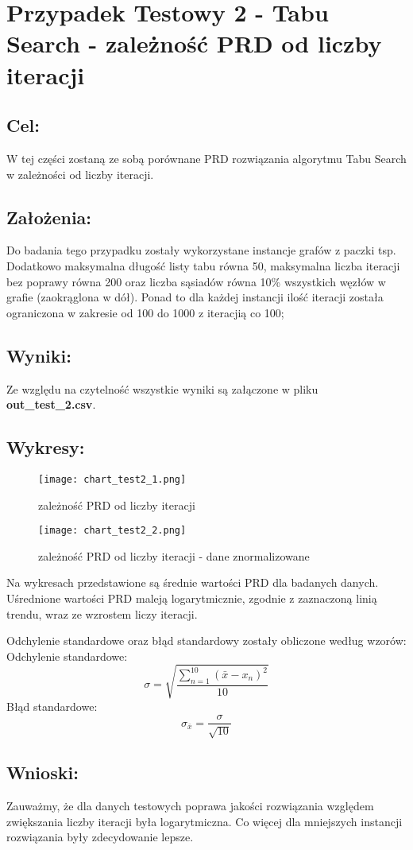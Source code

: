 \section{Przypadek Testowy 2 - Tabu Search - zależność PRD od liczby iteracji}
  \subsection{Cel:}
    W tej części zostaną ze sobą porównane PRD rozwiązania algorytmu Tabu Search w zależności od liczby iteracji.
    \subsection{Założenia:}
    Do badania tego przypadku zostały wykorzystane instancje grafów z paczki tsp. Dodatkowo maksymalna długość listy tabu równa 50, maksymalna liczba iteracji bez poprawy równa 200 oraz liczba sąsiadów równa 10\% wszystkich węzłów w grafie (zaokrąglona w dół). Ponad to dla każdej instancji ilość iteracji została ograniczona w zakresie od 100 do 1000 z iteracjią co 100;
  \subsection{Wyniki: }
    Ze względu na czytelność wszystkie wyniki są załączone w pliku \textbf{out_test_2.csv}.
  \subsection{Wykresy: }
    \begin{figure}[H]
      \texttt{[image: chart\_test2\_1.png]}
      \centering
      \caption{zależność PRD od liczby iteracji}
    \end{figure}
    \begin{figure}[H]
      \texttt{[image: chart\_test2\_2.png]}
      \centering
      \caption{zależność PRD od liczby iteracji - dane znormalizowane}
    \end{figure}

    Na wykresach przedstawione są średnie wartości PRD dla badanych danych. Uśrednione wartości PRD maleją logarytmicznie, zgodnie z zaznaczoną linią trendu, wraz ze wzrostem liczy iteracji.

    Odchylenie standardowe oraz błąd standardowy zostały obliczone według wzorów: \\
    Odchylenie standardowe:
    \[ \sigma = \sqrt{\frac{\sum_{n = 1}^{10}(\bar{x} - x_n)^2}{10}} \]
    Błąd standardowe:
    \[ \sigma_{\bar{x}} = \frac{\sigma}{\sqrt{10}} \]

  \subsection{Wnioski: }
    Zauważmy, że dla danych testowych poprawa jakości rozwiązania względem zwiększania liczby iteracji była logarytmiczna. Co więcej dla mniejszych instancji rozwiązania były zdecydowanie lepsze.

